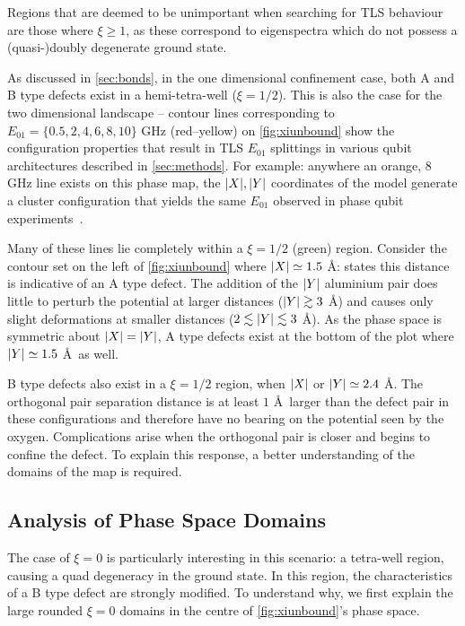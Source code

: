 Regions that are deemed to be unimportant when searching for TLS behaviour are those where $\xi \geq 1$, as these correspond to eigenspectra which do not possess a (quasi-)doubly degenerate ground state.

As discussed in \cref{sec:bonds}, in the one dimensional confinement case, both A and B type defects exist in a hemi-tetra-well ($\xi = 1/2$).
This is also the case for the two dimensional landscape -- contour lines corresponding to $E_{01} = \{0.5, 2, 4, 6, 8, 10\}$ GHz (red--yellow) on \cref{fig:xiunbound} show the configuration properties that result in TLS $E_{01}$ splittings in various qubit architectures described in \cref{sec:methods}.
For example: anywhere an orange, $8$ GHz line exists on this phase map, the $\lvert X\rvert, \lvert Y\rvert$ coordinates of the model generate a cluster configuration that yields the same $E_{01}$ observed in phase qubit experiments~\cite{Cole2010}.

Many of these lines lie completely within a $\xi = 1/2$ (green) region.
Consider the contour set on the left of \cref{fig:xiunbound} where $\lvert X\rvert \simeq 1.5$ \AA:  states this distance is indicative of an A type defect.
The addition of the $\lvert Y\rvert$ aluminium pair does little to perturb the potential at larger distances ($\lvert Y\rvert \gtrsim 3$ \AA) and causes only slight deformations at smaller distances ($2 \lesssim \lvert Y\rvert \lesssim 3$ \AA).
As the phase space is symmetric about $\lvert X\rvert = \lvert Y\rvert$, A type defects exist at the bottom of the plot where $\lvert Y\rvert \simeq 1.5$ \AA\ as well.

B type defects also exist in a $\xi = 1/2$ region, when $\lvert X\rvert$ or $\lvert Y\rvert \simeq 2.4$ \AA.
The orthogonal pair separation distance is at least $1$ \AA\ larger than the defect pair in these configurations and therefore have no bearing on the potential seen by the oxygen.
Complications arise when the orthogonal pair is closer and begins to confine the defect.
To explain this response, a better understanding of the domains of the map is required.

\subsection{Analysis of Phase Space Domains}\label{subsec:phaseanalysis}

The case of $\xi = 0$ is particularly interesting in this scenario: a tetra-well region, causing a quad degeneracy in the ground state.
In this region, the characteristics of a B type defect are strongly modified.
To understand why, we first explain the large rounded $\xi = 0$ domains in the centre of \cref{fig:xiunbound}'s phase space.

